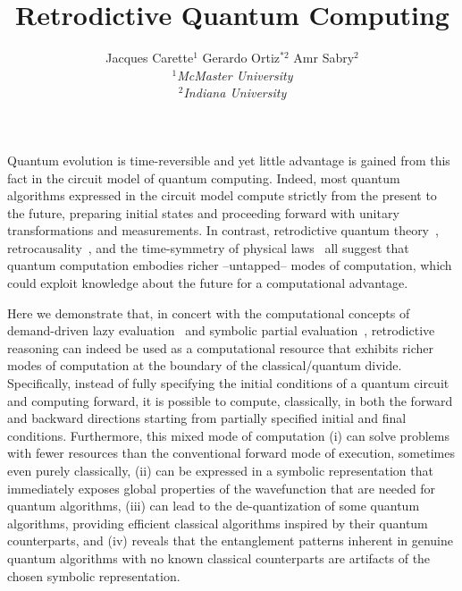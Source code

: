 \documentclass{article}
\begin{document}
\title{Retrodictive Quantum Computing}

\author{
  Jacques Carette$^1$ \qquad\qquad
  Gerardo Ortiz$^{*2}$ \qquad\qquad
  Amr Sabry$^2$\\[2ex]
$^1$\textit{McMaster University}\\
$^2$\textit{Indiana University}
}

\maketitle

\begin{refsection}

\noindent Quantum evolution is time-reversible and yet little
advantage is gained from this fact in the circuit model of quantum
computing. Indeed, most quantum algorithms expressed in the circuit
model compute strictly from the present to the future, preparing
initial states and proceeding forward with unitary transformations and
measurements. In contrast, retrodictive quantum
theory~\cite{sym13040586}, retrocausality~\cite{Aharonov2008}, and the
time-symmetry of physical laws~\cite{RevModPhys.27.179} all suggest
that quantum computation embodies richer --untapped-- modes of
computation, which could exploit knowledge about the future for a
computational advantage.

Here we demonstrate that, in concert with the computational concepts
of demand-driven lazy evaluation~\cite{lazyevaluator} and symbolic
partial evaluation~\cite{futamura}, retrodictive reasoning can indeed
be used as a computational resource that exhibits richer modes of
computation at the boundary of the classical/quantum
divide. Specifically, instead of fully specifying the initial
conditions of a quantum circuit and computing forward, it is possible
to compute, classically, in both the forward and backward directions
starting from partially specified initial and final
conditions. Furthermore, this mixed mode of computation (i) can solve
problems with fewer resources than the conventional forward mode of
execution, sometimes even purely classically, (ii) can be expressed in
a symbolic representation that immediately exposes global properties
of the wavefunction that are needed for quantum algorithms, (iii) can
lead to the de-quantization of some quantum algorithms, providing
efficient classical algorithms inspired by their quantum counterparts,
and (iv) reveals that the entanglement patterns inherent in genuine
quantum algorithms with no known classical counterparts are artifacts
of the chosen symbolic representation.


\end{refsection}
\end{document}

